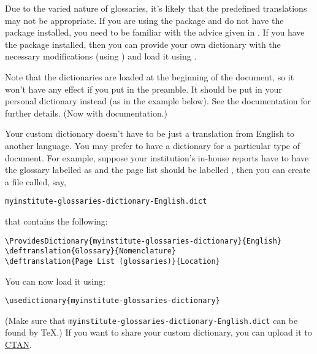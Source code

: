 \documentclass{nlctdoc}
\begin{document}
Due to the varied nature of glossaries, it's likely that the
predefined translations may not be appropriate. If you are using the
 package and do not have the  package
installed, you need to be familiar with the advice given in
. If you have the  package
installed, then you can provide your own dictionary with the
necessary modifications (using ) and load it
using .

\begin{important}
Note that the dictionaries are loaded at the beginning of the
document, so it won't have any effect if you put 
in the preamble. It should be put in your personal dictionary
instead (as in the example below). See the 
documentation for further details. (Now with 
documentation.)
\end{important}

Your custom dictionary doesn't have to be just a translation from
English to another language. You may prefer to have a dictionary for
a particular type of document. For example, suppose your
institution's in-house reports have to have the glossary labelled as
 and the page list should be labelled
, then you can create a file called, say,
\begin{verbatim}
myinstitute-glossaries-dictionary-English.dict
\end{verbatim}
that contains the following:
\begin{verbatim}
\ProvidesDictionary{myinstitute-glossaries-dictionary}{English}
\deftranslation{Glossary}{Nomenclature}
\deftranslation{Page List (glossaries)}{Location}
\end{verbatim}
You can now load it using:
\begin{verbatim}
\usedictionary{myinstitute-glossaries-dictionary}
\end{verbatim}
(Make sure that \texttt{myinstitute-glossaries-dictionary-English.dict}
can be found by \TeX.) If you want to share your custom dictionary,
you can upload it to \href{http://www.ctan.org/}{CTAN}.
\end{document}
